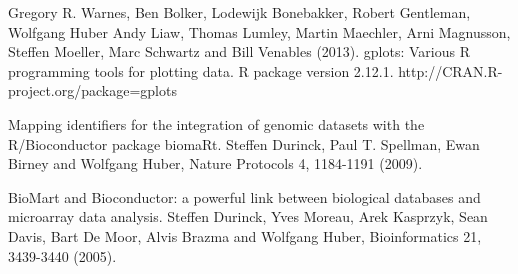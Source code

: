 \documentclass{article}
\begin{document}
  Gregory R. Warnes, Ben Bolker, Lodewijk Bonebakker, Robert Gentleman,
  Wolfgang Huber Andy Liaw, Thomas Lumley, Martin Maechler, Arni Magnusson,
  Steffen Moeller, Marc Schwartz and Bill Venables (2013).
  gplots: Various R programming tools for plotting data.
  R package version 2.12.1.
  http://CRAN.R-project.org/package=gplots
  
  Mapping identifiers for the integration of genomic datasets with the R/Bioconductor package biomaRt.
  Steffen Durinck, Paul T. Spellman, Ewan Birney and Wolfgang Huber, Nature Protocols 4, 1184-1191
  (2009).

  BioMart and Bioconductor: a powerful link between biological databases and microarray data analysis.
  Steffen Durinck, Yves Moreau, Arek Kasprzyk, Sean Davis, Bart De Moor, Alvis Brazma and Wolfgang
  Huber, Bioinformatics 21, 3439-3440 (2005).
  
\end{document}
